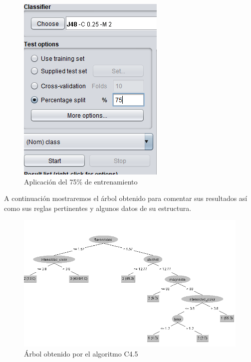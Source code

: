 \begin{figure}[H]
    \centering
    \includegraphics[width=\textwidth]{img/Porcentaje.PNG}
    \caption{Aplicación del 75\% de entrenamiento}
    
\end{figure}

A continuación mostraremos el árbol obtenido para comentar sus resultados así como sus reglas pertinentes y algunos datos de su estructura.

\begin{figure}[H]
    \centering
    \includegraphics[width=\textwidth]{img/Tree.PNG}
    \caption{Árbol obtenido por el algoritmo C4.5}
    
\end{figure}

